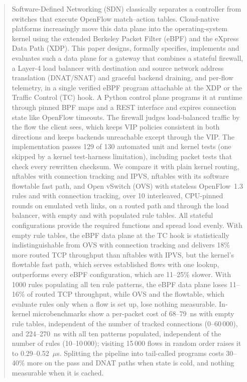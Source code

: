 \documentclass[conference]{IEEEtran}
\begin{document}
\begin{abstract}
Software-Defined Networking (SDN) classically separates a controller from
switches that execute OpenFlow match--action tables. Cloud-native platforms
increasingly move this data plane into the operating-system kernel using the
extended Berkeley Packet Filter (eBPF) and the eXpress Data Path (XDP). This
paper designs, formally specifies, implements and evaluates such a data plane
for a gateway that combines a stateful firewall, a Layer-4 load balancer with
destination and source network address translation (DNAT/SNAT) and graceful
backend draining, and per-flow telemetry, in a single verified eBPF program
attachable at the XDP or the Traffic Control (TC) hook. A Python control plane
programs it at runtime through pinned BPF maps and a REST interface and
expires connection state like OpenFlow timeouts. The firewall judges
load-balanced traffic by the flow the client sees, which keeps VIP policies
consistent in both directions and keeps backends unreachable except through
the VIP. The implementation passes 129 of 130 automated unit and kernel tests
(one skipped by a kernel test-harness limitation), including packet tests
that check every rewritten checksum. We compare it with plain kernel routing,
nftables with connection tracking and IPVS, nftables with its software
flowtable fast path, and Open vSwitch (OVS) with stateless OpenFlow~1.3 rules
and with connection tracking, over 10 interleaved, CPU-pinned rounds on
emulated veth links, on a routed path and through the load balancer, with
empty and with populated rule tables. All stateful configurations provide the
required functions and spread load evenly. With empty rule tables, the eBPF
data plane at the TC hook is statistically indistinguishable from OVS with
connection tracking and delivers 18\% more routed TCP throughput than
nftables with IPVS, but the kernel's flowtable fast path, which serves
established flows with one lookup, outperforms every eBPF configuration,
which are 11--25\% slower. With 1000 rules populating all ten rule patterns, the eBPF
data plane loses 11--16\% of routed TCP throughput, while OVS and the
flowtable, which evaluate rules only when a flow is set up, lose nothing
measurable. In-kernel microbenchmarks show a per-packet cost of 68--79~ns
with empty rule tables, independent of the number of tracked connections
(0--60\,000), and 224--270~ns with all ten patterns populated, independent of
the number of rules (10--10\,000); visiting 15\,000 flows in random order raises it to
0.29--0.52~$\mu$s. Splitting the pipeline into tail-called programs costs
30--40\% more on the pass and DNAT paths when state is cold, and nothing
measurable when it is cached.
\end{abstract}
\end{document}
